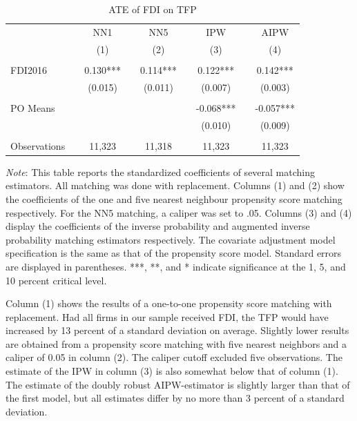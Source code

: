 \documentclass[a4paper,11pt]{scrartcl}
\begin{document}
\begin{table}[h!]
 	\centering
   	\caption{ATE of FDI on TFP}
   	\label{tab:mainresults}
\begin{threeparttable}
	
 \begin{tabular}{l*{8}{c}}
	\hline
	\hline
 			&& NN1 && NN5 && IPW && AIPW \\
 			&& (1) && (2) && (3)  && (4) \\ \hline
 			&&  &&  &&  &&    \\
FDI2016 	&& 0.130*** && 0.114*** && 0.122***  && 0.142***   \\
 			&& (0.015) && (0.011) && (0.007) &&   (0.003)  \\
 	&&  &&  &&  &&    \\
PO Means 	&& && && -0.068*** &&  -0.057*** \\
			&&  &&  && (0.010)  &&  (0.009) \\
			&&  &&  &&  &&    \\
 Observations && 11,323 && 11,318 && 11,323 && 11,323 \\ 
 	\hline
 	\hline 
\end{tabular}

\begin{tablenotes}[flushleft]
      \footnotesize
\item \textit{Note}: This table reports the standardized coefficients of several matching estimators. All matching was done with replacement. Columns (1) and (2) show the coefficients of the one and five nearest neighbour propensity score matching respectively. For the NN5 matching, a caliper was set to .05. Columns (3) and (4) display the coefficients of the inverse probability and augmented inverse probability matching estimators respectively. The covariate adjustment model specification is the same as that of the propensity score model. Standard errors are displayed in parentheses. ***, **, and * indicate significance at the 1, 5, and 10 percent critical level.

\end{tablenotes}

\end{threeparttable}
\end{table}

Column (1) shows the results of a one-to-one propensity score matching with replacement. Had all firms in our sample received FDI, the TFP would have increased by 13 percent of a standard deviation on average. Slightly lower results are obtained from a propensity score matching with five nearest neighbors and a caliper of 0.05 in column (2). The caliper cutoff excluded five observations. The estimate of the IPW in column (3) is also somewhat below that of column (1). The estimate of the doubly robust AIPW-estimator is slightly larger than that of the first model, but all estimates differ by no more than 3 percent of a standard deviation.
\end{document}
